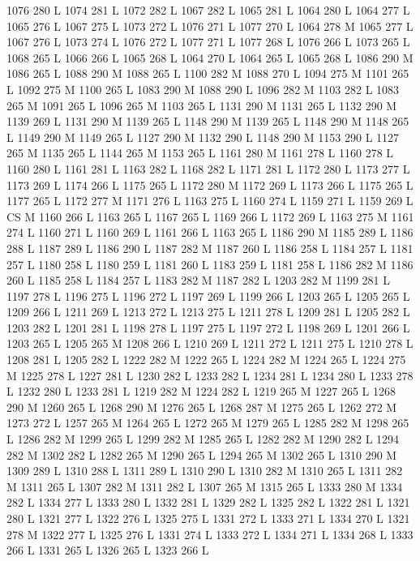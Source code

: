 {{{{{{{{{{{{{{{{{{1076 280 L
1074 281 L
1072 282 L
1067 282 L
1065 281 L
1064 280 L
1064 277 L
1065 276 L
1067 275 L
1073 272 L
1076 271 L
1077 270 L
1064 278 M 1065 277 L
1067 276 L
1073 274 L
1076 272 L
1077 271 L
1077 268 L
1076 266 L
1073 265 L
1068 265 L
1066 266 L
1065 268 L
1064 270 L
1064 265 L
1065 268 L
1086 290 M 1086 265 L
1088 290 M 1088 265 L
1100 282 M 1088 270 L
1094 275 M 1101 265 L
1092 275 M 1100 265 L
1083 290 M 1088 290 L
1096 282 M 1103 282 L
1083 265 M 1091 265 L
1096 265 M 1103 265 L
1131 290 M 1131 265 L
1132 290 M 1139 269 L
1131 290 M 1139 265 L
1148 290 M 1139 265 L
1148 290 M 1148 265 L
1149 290 M 1149 265 L
1127 290 M 1132 290 L
1148 290 M 1153 290 L
1127 265 M 1135 265 L
1144 265 M 1153 265 L
1161 280 M 1161 278 L
1160 278 L
1160 280 L
1161 281 L
1163 282 L
1168 282 L
1171 281 L
1172 280 L
1173 277 L
1173 269 L
1174 266 L
1175 265 L
1172 280 M 1172 269 L
1173 266 L
1175 265 L
1177 265 L
1172 277 M 1171 276 L
1163 275 L
1160 274 L
1159 271 L
1159 269 L
CS M
1160 266 L
1163 265 L
1167 265 L
1169 266 L
1172 269 L
1163 275 M 1161 274 L
1160 271 L
1160 269 L
1161 266 L
1163 265 L
1186 290 M 1185 289 L
1186 288 L
1187 289 L
1186 290 L
1187 282 M 1187 260 L
1186 258 L
1184 257 L
1181 257 L
1180 258 L
1180 259 L
1181 260 L
1183 259 L
1181 258 L
1186 282 M 1186 260 L
1185 258 L
1184 257 L
1183 282 M 1187 282 L
1203 282 M 1199 281 L
1197 278 L
1196 275 L
1196 272 L
1197 269 L
1199 266 L
1203 265 L
1205 265 L
1209 266 L
1211 269 L
1213 272 L
1213 275 L
1211 278 L
1209 281 L
1205 282 L
1203 282 L
1201 281 L
1198 278 L
1197 275 L
1197 272 L
1198 269 L
1201 266 L
1203 265 L
1205 265 M 1208 266 L
1210 269 L
1211 272 L
1211 275 L
1210 278 L
1208 281 L
1205 282 L
1222 282 M 1222 265 L
1224 282 M 1224 265 L
1224 275 M 1225 278 L
1227 281 L
1230 282 L
1233 282 L
1234 281 L
1234 280 L
1233 278 L
1232 280 L
1233 281 L
1219 282 M 1224 282 L
1219 265 M 1227 265 L
1268 290 M 1260 265 L
1268 290 M 1276 265 L
1268 287 M 1275 265 L
1262 272 M 1273 272 L
1257 265 M 1264 265 L
1272 265 M 1279 265 L
1285 282 M 1298 265 L
1286 282 M 1299 265 L
1299 282 M 1285 265 L
1282 282 M 1290 282 L
1294 282 M 1302 282 L
1282 265 M 1290 265 L
1294 265 M 1302 265 L
1310 290 M 1309 289 L
1310 288 L
1311 289 L
1310 290 L
1310 282 M 1310 265 L
1311 282 M 1311 265 L
1307 282 M 1311 282 L
1307 265 M 1315 265 L
1333 280 M 1334 282 L
1334 277 L
1333 280 L
1332 281 L
1329 282 L
1325 282 L
1322 281 L
1321 280 L
1321 277 L
1322 276 L
1325 275 L
1331 272 L
1333 271 L
1334 270 L
1321 278 M 1322 277 L
1325 276 L
1331 274 L
1333 272 L
1334 271 L
1334 268 L
1333 266 L
1331 265 L
1326 265 L
1323 266 L
}}}}}}}}}}}}}}}}}}
